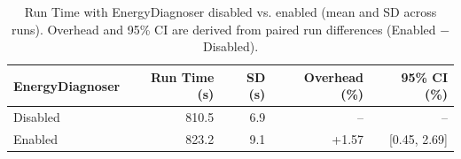\begin{table}[H]

\caption{\label{tab:runtime-benchmark}Run Time with EnergyDiagnoser disabled vs. enabled (mean and SD across runs). Overhead and 95\% CI are derived from paired run differences (Enabled $-$ Disabled).}
\centering
\begin{tabular}[t]{lrrrr}
\toprule
EnergyDiagnoser & Run Time (s) & SD (s) & Overhead (\%) & 95\% CI (\%)\\
\midrule
Disabled & 810.5 & 6.9 & -- & --\\
Enabled & 823.2 & 9.1 & +1.57 & [0.45, 2.69]\\
\bottomrule
\end{tabular}
\end{table}

